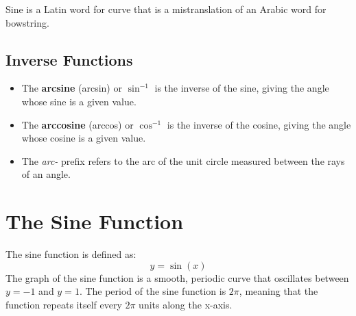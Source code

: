 \documentclass[12pt]{article}
\begin{document}
Sine is a Latin word for curve that is a mistranslation of an Arabic word for bowstring.\\

\begin{center}
\end{center}

\subsection*{Inverse Functions}
\begin{itemize}
    \item The \textbf{arcsine} (arcsin) or \textbf{$\sin^{-1}$} is the inverse of the sine, giving the angle whose sine is a given value.
    \item The \textbf{arccosine} (arccos) or \textbf{$\cos^{-1}$} is the inverse of the cosine, giving the angle whose cosine is a given value.
    \item The \textit{arc-} prefix refers to the arc of the unit circle measured between the rays of an angle.
\end{itemize}

\newpage

\section*{The Sine Function}
The sine function is defined as:
\[
y = \sin(x)
\]
The graph of the sine function is a smooth, periodic curve that oscillates between $y = -1$ and $y = 1$. The period of the sine function is $2\pi$, meaning that the function repeats itself every $2\pi$ units along the x-axis.

\begin{center}
\end{center}
\end{document}
